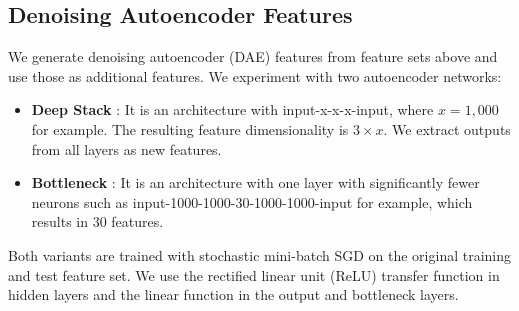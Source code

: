 \subsection{Denoising Autoencoder Features}
We generate denoising autoencoder (DAE) \cite{hinton2006reducing} features from feature sets above and use those as additional features.  
We experiment with two autoencoder networks:
\begin{itemize}
  \setlength\itemsep{0em}
  \item \textbf{Deep Stack} \cite{vincent2010stacked}: It is an architecture with input-x-x-x-input, where $x=1,000$ for example.
The resulting feature dimensionality is $3 \times x$. We extract outputs from all layers as new features.
  \item \textbf{Bottleneck}  \cite{sainath2012auto} : It is an architecture with one layer with significantly fewer neurons such as input-1000-1000-30-1000-1000-input for example, which results in 30 features.
\end{itemize}
Both variants are trained with stochastic mini-batch SGD on the original training and test feature set.
We use the rectified linear unit (ReLU) \cite{dahl2013improving} transfer function in hidden layers and the linear function in the output and bottleneck layers.
